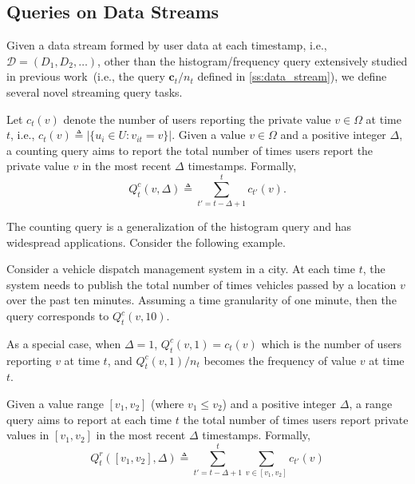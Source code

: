 \documentclass[acmsmall]{acmart}
\newcommand{\CD}{\mathcal{D}}
\newcommand{\bc}{\mathbf{c}}
\begin{document}



\subsection{Queries on Data Streams}
\label{ss:queries}

Given a data stream formed by user data at each timestamp, i.e., $\CD =
(D_1,D_2,\ldots)$, other than the histogram/frequency query extensively studied
in previous work~\cite{Kellaris2014, Ren2022}(i.e., the query $\bc_t/n_t$ defined in \cref{ss:data_stream}), we
define several novel streaming query tasks.

\begin{definition}
  Let $c_t(v)$ denote the number of users reporting the private value $v\in\Omega$ at
  time $t$, i.e., $c_t(v)\triangleq |\{u_i\in U\colon v_{it}=v\}|$.
  Given a value $v\in\Omega$ and a positive integer $\Delta$, a counting query
  aims to report the total number of times users report the private value $v$ in
  the most recent $\Delta$ timestamps.
  Formally,
  \[
    Q_t^c(v,\Delta)\triangleq \sum_{t'=t-\Delta +1}^t c_{t'}(v).
  \]
\end{definition}

The counting query is a generalization of the histogram query and has widespread
applications.
Consider the following example.

\begin{example}\label{exam:vehicle}
  Consider a vehicle dispatch management system in a city.
  At each time $t$, the system needs to publish the total number of times
  vehicles passed by a location $v$ over the past ten minutes.
  Assuming a time granularity of one minute, then the query corresponds to
  $Q_t^c(v, 10)$.
\end{example}

As a special case, when $\Delta=1$, $Q_t^c(v,1)=c_t(v)$ which is the number of
users reporting $v$ at time $t$, and $Q_t^c(v,1)/n_t$ becomes the frequency of
value $v$ at time $t$.

\begin{definition}
  Given a value range $[v_1, v_2]$ (where $v_1\leq v_2$) and a positive integer
  $\Delta$, a range query aims to report at each time $t$ the total number of
  times users report private values in $[v_1, v_2]$ in the most recent
  $\Delta$ timestamps.
  Formally,
  \[
    Q_t^r([v_1, v_2],\Delta)\triangleq
    \sum_{t'=t-\Delta +1}^t\sum_{v\in[v_1,v_2]} c_{t'}(v)
  \]
\end{definition}
\end{document}
